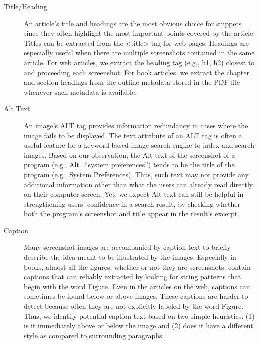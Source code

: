 \documentclass{www2010-submission}
\begin{document}
\begin{description}

\item[Title/Heading] An article's title and headings are the most
  obvious choice for snippets since they often highlight the most
  important points covered by the article. Titles can be extracted
  from the <title> tag for web pages. Headings are especially useful
  when there are multiple screenshots contained in the same
  article. For web articles, we extract the heading tag (e.g., h1, h2)
  closest to and proceeding each screenshot. For book articles, we
  extract the chapter and section headings from the outline metadata
  stored in the PDF file whenever such metadata is available.

\item[Alt Text] An image's ALT tag provides information redundancy in
  cases where the image fails to be displayed. The text attribute of an
  ALT tag is often a useful feature for a keyword-based image search
  engine to index and search images. Based on our observation, the Alt
  text of the screenshot of a program (e.g., Alt=``system preferences'') tends
  to be the title of the program (e.g., System Preferences).
  Thus, such text may not provide any additional information other
  than what the users can already read directly on their computer
  screen. Yet, we expect Alt text can still be helpful in
  strengthening users' confidence in a search result, by checking
  whether both the program's screenshot and title appear in the
  result's excerpt.

\item[Caption] Many screenshot images are accompanied by caption text
  to briefly describe the idea meant to be illustrated by the images.
  Especially in books, almost all the figures, whether or not they are
  screenshots, contain captions that can reliably extracted by looking
  for string patterns that begin with the word Figure.  Even in the
  articles on the web, captions can sometimes be found below or above
  images. These captions are harder to detect because often they are
  not explicitly labeled by the word Figure. Thus, we identify
  potential caption text based on two simple heuristics: (1) is it
  immediately above or below the image and (2) does it have a
  different style as compared to surrounding paragraphs.


\end{description}
\end{document}
